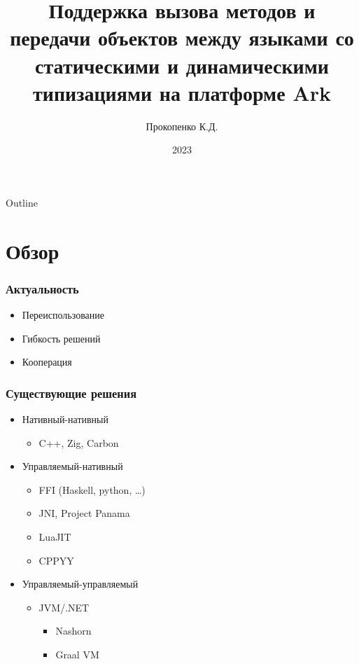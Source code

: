 \documentclass{beamer}
\title{Поддержка вызова методов и передачи объектов между языками со статическими и динамическими типизациями на платформе Ark}
\author{Прокопенко К.Д.}
\date{2023}
\begin{document}


\frame{\titlepage}

\begin{frame}{Outline}
	\tableofcontents
\end{frame}

\section{Обзор}

\begin{frame}
\frametitle{Актуальность}
\begin{itemize}
	\item Переиспользование
	\item Гибкость решений
	\item Кооперация
\end{itemize}
\end{frame}

\begin{frame}
\frametitle{Существующие решения}
\begin{itemize}
	\item Нативный-нативный
		\begin{itemize}
			\item{C++, Zig, Carbon}
		\end{itemize}
	\item Управляемый-нативный
		\begin{itemize}
			\item{FFI (Haskell, python, \dots)}
			\item{JNI, Project Panama}
			\item{LuaJIT}
			\item{CPPYY}
		\end{itemize}
	\item Управляемый-управляемый
		\begin{itemize}
			\item{JVM/.NET}
			\begin{itemize}
				\item{Nashorn}
				\item{Graal VM}
			\end{itemize}
		\end{itemize}
\end{itemize}
\end{frame}
\end{document}
